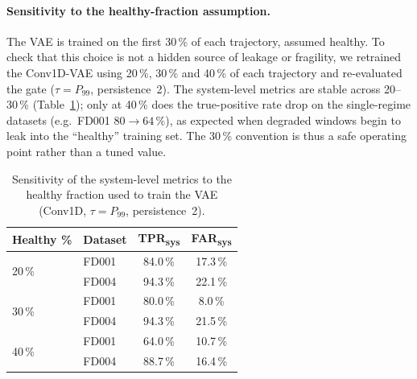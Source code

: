 \documentclass[5p,times,authoryear]{elsarticle}
\begin{document}
\begin{table}[!t]
\centering
\caption{Critical-zone RMSE of the Transformer evaluated over all critical windows vs.\ only the post-trigger critical windows of the system (best configuration per dataset). Coverage is the fraction of critical windows captured after the trigger. Both columns use the single deployed model over the full test trajectory; the small difference with the RMSE@critical of Table~\ref{tab:rul} reflects that the latter is the mean over the ten seeds.}
\label{tab:m8}
\small
{}
\end{table}

\paragraph{Sensitivity to the healthy-fraction assumption.} The VAE is trained on the first 30\,\% of each trajectory, assumed healthy. To check that this choice is not a hidden source of leakage or fragility, we retrained the Conv1D-VAE using 20\,\%, 30\,\% and 40\,\% of each trajectory and re-evaluated the gate ($\tau{=}P_{99}$, persistence~2). The system-level metrics are stable across 20--30\,\% (Table~\ref{tab:c5}); only at 40\,\% does the true-positive rate drop on the single-regime datasets (e.g.\ FD001 $80\rightarrow64\,\%$), as expected when degraded windows begin to leak into the ``healthy'' training set. The 30\,\% convention is thus a safe operating point rather than a tuned value.

\begin{table}[!t]
\centering
\caption{Sensitivity of the system-level metrics to the healthy fraction used to train the VAE (Conv1D, $\tau{=}P_{99}$, persistence~2).}
\label{tab:c5}
\small
\begin{tabular}{llcc}
\toprule
Healthy \% & Dataset & TPR\textsubscript{sys} & FAR\textsubscript{sys} \\
\midrule
\multirow{2}{*}{20\,\%} & FD001 & 84.0\,\% & 17.3\,\% \\
                        & FD004 & 94.3\,\% & 22.1\,\% \\
\multirow{2}{*}{30\,\%} & FD001 & 80.0\,\% & 8.0\,\% \\
                        & FD004 & 94.3\,\% & 21.5\,\% \\
\multirow{2}{*}{40\,\%} & FD001 & 64.0\,\% & 10.7\,\% \\
                        & FD004 & 88.7\,\% & 16.4\,\% \\
\bottomrule
\end{tabular}
\end{table}
\end{document}
